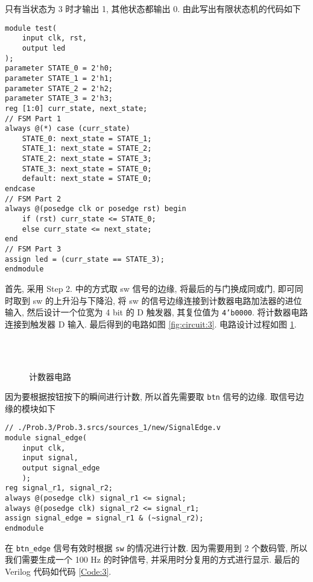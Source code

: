 \documentclass[UTF8,fontset=fandol]{ctexart}
\begin{document}
\begin{ExQuestions}
  只有当状态为 3 时才输出 1, 其他状态都输出 0. 由此写出有限状态机的代码如下
  \begin{lstlisting}[style = verilogstyle, caption = {Step 5. 中代码改写为有限状态机的形式}]
module test(
    input clk, rst,
    output led
);
parameter STATE_0 = 2'h0;
parameter STATE_1 = 2'h1;
parameter STATE_2 = 2'h2;
parameter STATE_3 = 2'h3;
reg [1:0] curr_state, next_state;
// FSM Part 1
always @(*) case (curr_state)
    STATE_0: next_state = STATE_1;
    STATE_1: next_state = STATE_2;
    STATE_2: next_state = STATE_3;
    STATE_3: next_state = STATE_0;
    default: next_state = STATE_0;
endcase
// FSM Part 2
always @(posedge clk or posedge rst) begin
    if (rst) curr_state <= STATE_0;
    else curr_state <= next_state;
end
// FSM Part 3
assign led = (curr_state == STATE_3);
endmodule
  \end{lstlisting}
  \question 首先, 采用 Step 2. 中的方式取 sw 信号的边缘, 将最后的与门换成同或门, 即可同时取到 sw 的上升沿与下降沿,
  将 sw 的信号边缘连接到计数器电路加法器的进位输入,
  然后设计一个位宽为 4 bit 的 D 触发器, 其复位值为 \texttt{4'b0000}. 将计数器电路连接到触发器 D 输入. 最后得到的电路如图 \ref{fig:circuit:3}. 电路设计过程如图 \ref{fig:circuit}.
  \begin{figure}[!htbp]
      \centering
      \\
      \\
      \caption{计数器电路}
      \label{fig:circuit}
  \end{figure}
  \question 因为要根据按钮按下的瞬间进行计数, 所以首先需要取 \texttt{btn} 信号的边缘. 取信号边缘的模块如下
  \begin{lstlisting}[style = verilogstyle, caption = {取信号边缘的模块}, label = {Code:2}]
// ./Prob.3/Prob.3.srcs/sources_1/new/SignalEdge.v
module signal_edge(
    input clk,
    input signal,
    output signal_edge
    );
reg signal_r1, signal_r2;
always @(posedge clk) signal_r1 <= signal;
always @(posedge clk) signal_r2 <= signal_r1;
assign signal_edge = signal_r1 & (~signal_r2);
endmodule
  \end{lstlisting}
  在 \texttt{btn\_edge} 信号有效时根据 \texttt{sw} 的情况进行计数.
  因为需要用到 2 个数码管, 所以我们需要生成一个 100 Hz 的时钟信号, 并采用时分复用的方式进行显示.
  最后的 Verilog 代码如代码 \ref{Code:3}. 
  \begin{lstlisting}[style = verilogstyle, caption = {题目 3. 的 Verilog 代码}, label = {Code:3}]

\end{lstlisting}
\end{ExQuestions}
\end{document}
